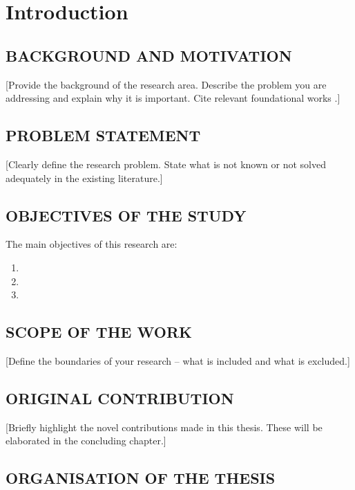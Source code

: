 \chapter{Introduction}

\section{BACKGROUND AND MOTIVATION}

[Provide the background of the research area. Describe the problem
you are addressing and explain why it is important. Cite relevant
foundational works \citep{example_book}.]

\section{PROBLEM STATEMENT}

[Clearly define the research problem. State what is not known or
not solved adequately in the existing literature.]

\section{OBJECTIVES OF THE STUDY}

The main objectives of this research are:
\begin{enumerate}
    \item [Objective 1]
    \item [Objective 2]
    \item [Objective 3]
\end{enumerate}

\section{SCOPE OF THE WORK}

[Define the boundaries of your research -- what is included and
what is excluded.]

\section{ORIGINAL CONTRIBUTION}

[Briefly highlight the novel contributions made in this thesis.
These will be elaborated in the concluding chapter.]

\section{ORGANISATION OF THE THESIS}

